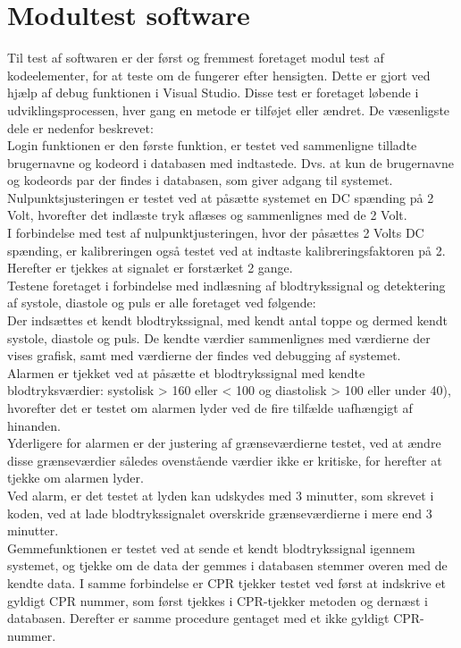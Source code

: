 \section{Modultest software}
Til test af softwaren er der først og fremmest foretaget modul test af  kodeelementer, for at teste om de fungerer efter hensigten. Dette er gjort ved hjælp af debug funktionen i Visual Studio. Disse test er foretaget løbende i udviklingsprocessen, hver gang en metode er tilføjet eller ændret. De væsenligste dele er nedenfor beskrevet: \\[1ex]
Login funktionen er den første funktion, er testet ved sammenligne tilladte brugernavne og kodeord i databasen med indtastede. Dvs. at kun de brugernavne og kodeords par der findes i databasen, som giver adgang til systemet.\\[1ex]
Nulpunktsjusteringen er testet ved at påsætte systemet en DC spænding på 2 Volt, hvorefter det indlæste tryk aflæses og sammenlignes med de 2 Volt. \\
I forbindelse med test af nulpunktjusteringen, hvor der påsættes 2 Volts DC spænding, er kalibreringen også testet ved at indtaste kalibreringsfaktoren på 2. Herefter er tjekkes at signalet er forstærket 2 gange.\\[1ex]
Testene foretaget i forbindelse med indlæsning af blodtrykssignal og detektering af systole, diastole og puls er alle foretaget ved følgende:\\
Der indsættes et kendt blodtrykssignal, med kendt antal toppe og dermed kendt systole, diastole og puls. De kendte værdier sammenlignes med værdierne der vises grafisk, samt med værdierne der findes ved debugging af systemet.\\[1ex]
Alarmen er tjekket ved at påsætte et blodtrykssignal med kendte blodtryksværdier: systolisk > 160 eller < 100 og diastolisk > 100 eller under 40), hvorefter det er testet om alarmen lyder ved de fire tilfælde uafhængigt af hinanden.\\ Yderligere for alarmen er der justering af grænseværdierne testet, ved at ændre disse grænseværdier således ovenstående værdier ikke er kritiske, for herefter at tjekke om alarmen lyder.\\ Ved alarm, er det testet at lyden kan udskydes med 3 minutter, som skrevet i koden, ved at lade blodtrykssignalet overskride grænseværdierne i mere end 3 minutter.\\[1ex]
Gemmefunktionen er testet ved at sende et kendt blodtrykssignal igennem systemet, og tjekke om de data der gemmes i databasen stemmer overen med de kendte data. I samme forbindelse er CPR tjekker testet ved først at indskrive et gyldigt CPR nummer, som først tjekkes i CPR-tjekker metoden og dernæst i databasen. Derefter er samme procedure gentaget med et ikke gyldigt CPR-nummer.


